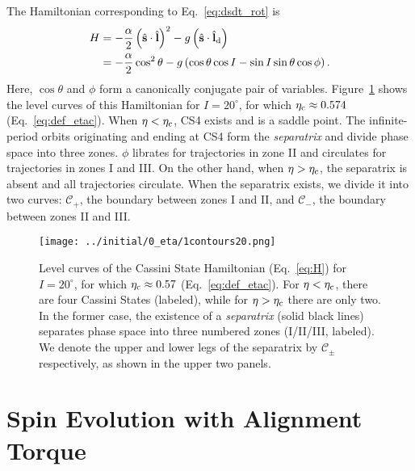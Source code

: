 \documentclass[
        fleqn,
        usenatbib,
    ]{mnras}
\newcommand*{\p}[1]{\left(#1\right)}
\newcommand*{\uv}[1]{\hat{\mathbf{#1}}}
\begin{document}
The Hamiltonian corresponding to Eq.~\eqref{eq:dsdt_rot} is
\begin{align}
    H &= -\frac{\alpha}{2}\p{\uv{s} \cdot \uv{l}}^2
            - g\p{\uv{s} \cdot \uv{l}_{\rm d}}\nonumber\\
        &= -\frac{\alpha}{2} \cos^2\theta
            - g\p{\cos\theta \cos I - \sin I \sin\theta \cos \phi}.\label{eq:H}
\end{align}
Here, $\cos \theta$ and $\phi$ form a canonically conjugate pair of variables.
Figure~\ref{fig:1contours} shows the level curves of this Hamiltonian for $I =
20^\circ$, for which $\eta_{\rm c} \approx 0.574$ (Eq.~\ref{eq:def_etac}). When $\eta
< \eta_{\rm c}$, CS4 exists and is a saddle point. The infinite-period orbits
originating and ending at CS4 form the \emph{separatrix} and divide phase space
into three zones. $\phi$ librates for trajectories in zone II and circulates for
trajectories in zones I and III\@. On the other hand, when $\eta > \eta_{\rm
c}$, the separatrix is absent and all trajectories circulate. When the
separatrix exists, we divide it into two curves: $\mathcal{C}_+$, the boundary
between zones I and II, and $\mathcal{C}_-$, the boundary between zones II and
III\@.
\begin{figure}
    \centering
    \texttt{[image: ../initial/0\_eta/1contours20.png]}
    \caption{Level curves of the Cassini State Hamiltonian (Eq.~\ref{eq:H}) for
    $I = 20^\circ$, for which $\eta_{\rm c} \approx 0.57$
    (Eq.~\ref{eq:def_etac}). For $\eta < \eta_{\rm c}$, there are four Cassini
    States (labeled), while for $\eta > \eta_{\rm c}$ there are only two. In the
    former case, the existence of a \emph{separatrix} (solid black lines)
    separates phase space into three numbered zones (I/II/III, labeled). We
    denote the upper and lower legs of the separatrix by $\mathcal{C}_{\pm}$
    respectively, as shown in the upper two panels. }\label{fig:1contours}
\end{figure}

\section{Spin Evolution with Alignment Torque}\label{s:toy_model}
\end{document}
